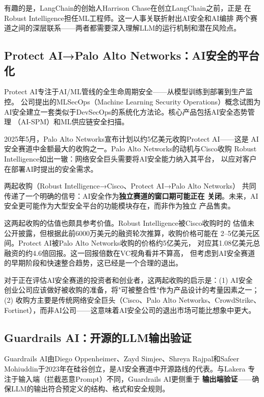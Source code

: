 有趣的是，LangChain的创始人Harrison Chase在创立LangChain之前，正是
在Robust Intelligence担任ML工程师。这一人事关联折射出AI安全和AI编排
两个赛道之间的深层联系——两者都需要深入理解LLM的运行机制和潜在风险点。

\subsection{Protect AI→Palo Alto Networks：AI安全的平台化}
\label{subsec:protect-ai}

Protect AI专注于AI/ML管线的全生命周期安全——从模型训练到部署到生产监控。
公司提出的MLSecOps（Machine Learning Security Operations）概念试图为
AI安全建立一套类似于DevSecOps的系统化方法论。核心产品包括AI安全态势管理
（AI-SPM）和ML供应链安全扫描。

2025年5月，Palo Alto Networks宣布计划以约5亿美元收购Protect AI——这是
AI安全赛道中金额最大的收购之一。Palo Alto Networks的动机与Cisco收购
Robust Intelligence如出一辙：网络安全巨头需要将AI安全能力纳入其平台，
以应对客户在部署AI时提出的安全需求。

两起收购（Robust Intelligence→Cisco、Protect AI→Palo Alto Networks）
共同传递了一个明确的信号：AI安全作为\textbf{独立赛道的窗口期可能正在
关闭}。未来，AI安全更可能作为大型安全平台的功能模块存在，而非作为独立
产品售卖。

这两起收购的估值也颇具参考价值。Robust Intelligence被Cisco收购时的
估值未公开披露，但根据此前6000万美元的融资轮次推算，收购价格可能在
2--5亿美元区间。Protect AI被Palo Alto Networks收购的价格约5亿美元，
对应其1.08亿美元总融资的约4.6倍回报。这一回报倍数在VC视角看并不算高，
但考虑到AI安全赛道的早期阶段和快速整合趋势，这已经是一个合理的退出。

对于正在评估AI安全赛道的投资者和创业者，这两起收购的启示是：(1) AI安全
创业公司应该做好被收购的准备，将"可被整合性"作为产品设计的考量因素之一；
(2) 收购方主要是传统网络安全巨头（Cisco、Palo Alto Networks、CrowdStrike、
Fortinet），而非AI公司——这意味着AI安全公司的退出市场可能比想象中更大。

\subsection{Guardrails AI：开源的LLM输出验证}
\label{subsec:guardrails-ai}

Guardrails AI由Diego Oppenheimer、Zayd Simjee、Shreya Rajpal和Safeer
Mohiuddin于2023年在硅谷创立，是AI安全赛道中开源路线的代表。与Lakera
专注于输入端（拦截恶意Prompt）不同，Guardrails AI更侧重于
\textbf{输出端验证}——确保LLM的输出符合预定义的结构、格式和安全规则。

